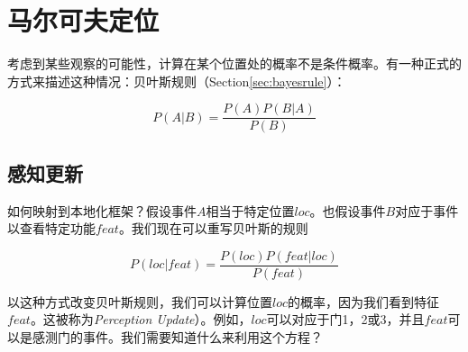 
\section{马尔可夫定位}\label{sec：markovloc}
考虑到某些观察的可能性，计算在某个位置处的概率不是条件概率。有一种正式的方式来描述这种情况：贝叶斯规则（Section\ref{sec:bayesrule}）：

\begin{equation}
P(A|B)=\frac{P(A)P(B|A)}{P(B)}
\end{equation}


\subsection{感知更新}
如何映射到本地化框架？假设事件$A$相当于特定位置$loc$。也假设事件$B$对应于事件以查看特定功能$feat$。我们现在可以重写贝叶斯的规则


\begin{equation}
P(loc|feat)=\frac{P(loc)P(feat|loc)}{P(feat)}
\end{equation}


以这种方式改变贝叶斯规则，我们可以计算位置$loc$的概率，因为我们看到特征$feat$。这被称为\emph{Perception Update}）。例如，$loc$可以对应于门1，2或3，并且$feat$可以是感测门的事件。我们需要知道什么来利用这个方程？

